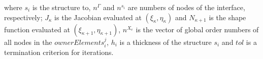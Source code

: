 where \(s_i\) is the structure to, \(n^{\Gamma}\) and \(n^{s_i}\) are numbers of nodes of the interface, respectively; \(J_{\kappa}\) is the Jacobian evaluated at \((\xi_{\kappa},\eta_{\kappa})\) and \(N_{\kappa+1}\) is the shape function evaluated at \((\xi_{\kappa+1},\eta_{\kappa+1})\), \(n^{X_e}\) is the vector of global order numbers of all nodes in the \(ownerElements^j_i\), \(h_i\) is a thickness of the structure \(s_i\) and \(tol\) is a termination criterion for iterations.
